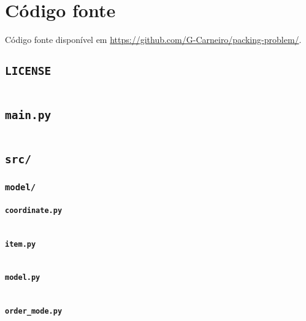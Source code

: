\chapter{Código fonte}\label{ch:codigo-fonte}

Código fonte disponível em \url{https://github.com/G-Carneiro/packing-problem/}.


\section{\texttt{LICENSE}}\label{sec:license}
\inputminted{text}{LICENSE}


\section{\texttt{main.py}}\label{sec:main.py}
\inputminted{py}{main.py}


\section{\texttt{src/}}\label{sec:src/}

\subsection{\texttt{model/}}\label{subsec:model/}

\subsubsection{\texttt{coordinate.py}}\label{subsubsec:coordinate.py}
\inputminted{py}{src/model/coordinate.py}

\subsubsection{\texttt{item.py}}\label{subsubsec:item.py}
\inputminted{py}{src/model/item.py}

\subsubsection{\texttt{model.py}}\label{subsubsec:model.py}
\inputminted{py}{src/model/model.py}

\subsubsection{\texttt{order\_mode.py}}\label{subsubsec:order_mode.py}
\inputminted{py}{src/model/order_mode.py}

